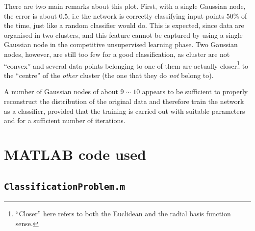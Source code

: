 \documentclass[12pt,titlepage]{article}
\begin{document}
There are two main remarks about this plot. First, with a single Gaussian node, the error is about 0.5, i.e the network is correctly classifying input points 50\% of the time, just like a random classifier would do. This is expected, since data are organised in two clusters, and this feature cannot be captured by using a single Gaussian node in the competitive unsupervised learning phase. Two Gaussian nodes, however, are still too few for a good classification, as cluster are not ``convex'' and several data points belonging to one of them are actually closer\footnote{``Closer'' here refers to both the Euclidean and the radial basis function sense.} to the ``centre'' of the \emph{other} cluster (the one that they do \emph{not} belong to).

A number of Gaussian nodes of about $9\sim 10$ appears to be sufficient to properly reconstruct the distribution of the original data and therefore train the network as a classifier, provided that the training is carried out with suitable parameters and for a sufficient number of iterations. 


\clearpage
\appendix

\section*{MATLAB code used}
\subsection*{\texttt{ClassificationProblem.m}}
\end{document}
